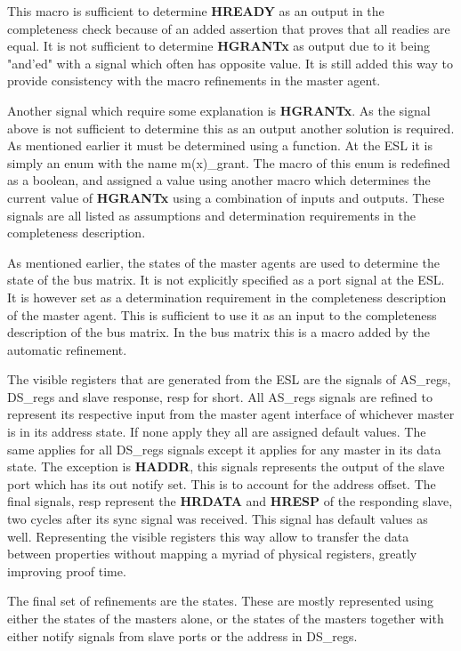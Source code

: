 This macro is sufficient to determine \textbf{HREADY} as an output in the completeness check because of an added assertion that proves that all readies
are equal. It is not sufficient to determine \textbf{HGRANTx} as output due to it being "and'ed" with a signal which often has opposite value. It is still added this way to provide consistency with the macro refinements in the master agent. \par
Another signal which require some explanation is \textbf{HGRANTx}. As the signal above is not sufficient to determine this as an output another solution is required. As mentioned earlier it must be determined using a function. At the ESL it is simply an enum with the name m(x)\_grant. The macro of this enum
is redefined as a boolean, and assigned a value using another macro which determines the current value of \textbf{HGRANTx} using a combination of inputs
and outputs. These signals are all listed as assumptions and determination requirements in the completeness description. \par
As mentioned earlier, the states of the master agents are used to determine the state of the bus matrix. It is not explicitly specified as a port signal at the
ESL. It is however set as a determination requirement in the completeness description of the master agent. This is sufficient to use it as an input to the
completeness description of the bus matrix. In the bus matrix this is a macro added by the automatic refinement. \par
The visible registers that are generated from the ESL are the signals of AS\_regs, DS\_regs and slave response, resp for short. All AS\_regs signals are refined
to represent its respective input from the master agent interface of whichever master is in its address state. If none apply they all are assigned default values. The same applies for all DS\_regs signals except it applies for any master in its data state. The exception is \textbf{HADDR}, this signals represents the output of the slave port which has its out notify set. This is to account for the address offset. The final signals, resp represent the \textbf{HRDATA} and \textbf{HRESP} of the responding slave, two cycles after its sync signal was received. This signal has default values as well. Representing the visible registers this way allow to transfer the data between properties without mapping a myriad of physical registers, greatly improving proof time. \par
The final set of refinements are the states. These are mostly represented using either the states of the masters alone, or the states of the masters together with either notify signals from slave ports or the address in DS\_regs. 


